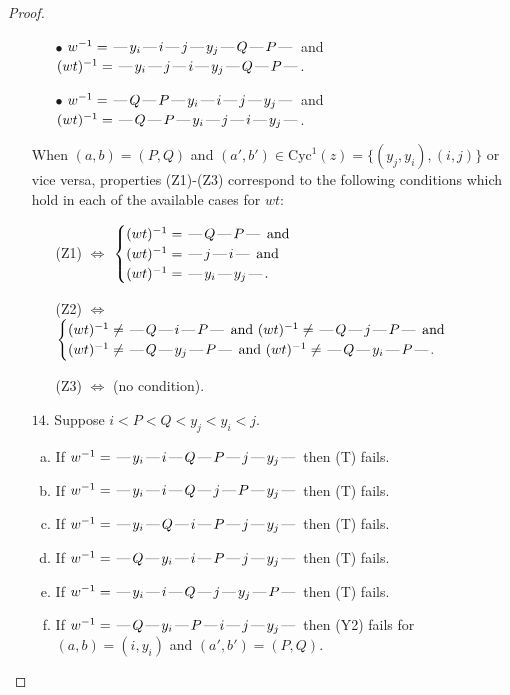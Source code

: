 \documentclass[10pt]{article}
\theoremstyle{definition}
\theoremstyle{definition}
\def\dash{\text{\hspace{0.5mm}---\hspace{0.5mm}}}
\def\Cyc{\mathrm{Cyc}}
\begin{document}
\begin{proof}
\begin{enumerate}
\begin{enumerate}
\item[$\bullet$] $w^{-1} = \dash y_i\dash i\dash j\dash y_j\dash Q\dash P\dash $ and $(wt)^{-1} = \dash y_i\dash j\dash i\dash y_j\dash Q\dash P\dash $.
\item[$\bullet$] $w^{-1} = \dash Q\dash P\dash y_i\dash i\dash j\dash y_j\dash $ and $(wt)^{-1} = \dash Q\dash P\dash y_i\dash j\dash i\dash y_j\dash $.
\end{enumerate}
When $(a,b)= (P,Q)$ and $(a',b')\in \Cyc^1(z)=\{(y_j,y_i),(i,j)\}$ or vice versa,
properties (Z1)-(Z3) correspond to the following conditions which
hold in each of the available cases for $wt$:
\begin{enumerate}
\item[](Z1) $\Leftrightarrow$ $\begin{cases}\text{$(wt)^{-1} = \dash Q \dash P \dash$}\text{ and }\\
\text{$(wt)^{-1} = \dash j \dash i \dash$}\text{ and }\\
\text{$(wt)^{-1} = \dash y_i \dash y_j \dash$}.\end{cases}$
\item[](Z2) $\Leftrightarrow$ $\begin{cases}\text{$(wt)^{-1} \neq \dash Q \dash i \dash P \dash$ and $(wt)^{-1}\neq \dash Q \dash j \dash P \dash$}\text{ and }\\
\text{$(wt)^{-1} \neq \dash Q \dash y_j \dash P \dash$ and $(wt)^{-1}\neq \dash Q \dash y_i \dash P \dash$}.\end{cases}$
\item[](Z3) $\Leftrightarrow$ (no condition).
\end{enumerate}
\item[$14$.] Suppose $i < P < Q < y_j < y_i < j$.
\begin{enumerate}[(a)]
\item If $w^{-1} = \dash y_i\dash i\dash Q\dash P\dash j\dash y_j\dash $ then (T) fails.
\item If $w^{-1} = \dash y_i\dash i\dash Q\dash j\dash P\dash y_j\dash $ then (T) fails.
\item If $w^{-1} = \dash y_i\dash Q\dash i\dash P\dash j\dash y_j\dash $ then (T) fails.
\item If $w^{-1} = \dash Q\dash y_i\dash i\dash P\dash j\dash y_j\dash $ then (T) fails.
\item If $w^{-1} = \dash y_i\dash i\dash Q\dash j\dash y_j\dash P\dash $ then (T) fails.
\item If $w^{-1} = \dash Q\dash y_i\dash P\dash i\dash j\dash y_j\dash $ then (Y2) fails for $(a,b)=(i,y_i)$ and $(a',b')=(P,Q)$.

\end{enumerate}
\end{enumerate}
\end{proof}
\end{document}
